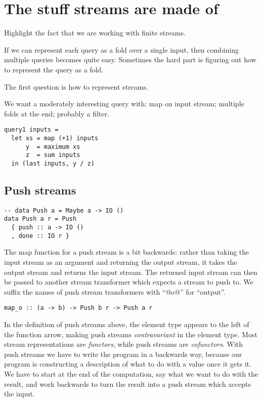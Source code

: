 
\section{The stuff streams are made of}

Highlight the fact that we are working with finite streams.

If we can represent each query as a fold over a single input, then combining multiple queries becomes quite easy.
Sometimes the hard part is figuring out how to represent the query as a fold.

The first question is how to represent streams.

We want a moderately interesting query with: map on input stream; multiple folds at the end; probably a filter.

\begin{lstlisting}
query1 inputs =
  let xs = map (+1) inputs
      y  = maximum xs
      z  = sum inputs
  in (last inputs, y / z)
\end{lstlisting}

\subsection{Push streams}


\begin{lstlisting}
-- data Push a = Maybe a -> IO ()
data Push a r = Push
  { push :: a -> IO ()
  , done :: IO r }
\end{lstlisting}

The map function for a push stream is a bit backwards: rather than taking the input stream as an argument and returning the output stream, it takes the output stream and returns the input stream.
The returned input stream can then be passed to another stream transformer which expects a stream to push to.
We suffix the names of push stream transformers with ``@o@'' for ``output''.

\begin{lstlisting}
map_o :: (a -> b) -> Push b r -> Push a r
\end{lstlisting}

In the definition of push streams above, the element type appears to the left of the function arrow, making push streams \emph{contravariant} in the element type.
Most stream representations are \emph{functors}, while push streams are \emph{cofunctors}.
With push streams we have to write the program in a backwards way, because our program is constructing a description of what to do with a value once it gets it.
We have to start at the end of the computation, say what we want to do with the result, and work backwards to turn the result into a push stream which accepts the input.

